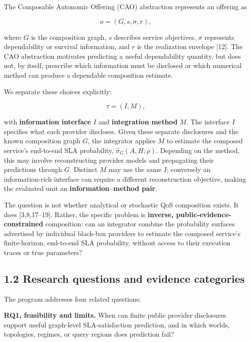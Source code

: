 \documentclass[10pt,a4paper]{article}
\begin{document}
The Composable Autonomic Offering (CAO) abstraction represents an offering as

\begin{equation*}
o=(G,s,\sigma,r), \tag{1}
\end{equation*}

where $G$ is the composition graph, $s$ describes service objectives, $\sigma$ represents dependability or survival information, and $r$ is the realization envelope [12]. The CAO abstraction motivates predicting a useful dependability quantity, but does not, by itself, prescribe which information must be disclosed or which numerical method can produce a dependable composition estimate.

We separate these choices explicitly:

\begin{equation*}
\tau=(I,M), \tag{2}
\end{equation*}

with \textbf{information interface} $I$ and \textbf{integration method} $M$. The interface $I$ specifies what each provider discloses. Given these separate disclosures and the known composition graph $G$, the integrator applies $M$ to estimate the composed service's end-to-end SLA probability, $\widehat\sigma_G(A,H;\rho)$. Depending on the method, this may involve reconstructing provider models and propagating their predictions through $G$. Distinct $M$ may use the same $I$; conversely an information-rich interface can require a different reconstruction objective, making the evaluated unit an \textbf{information–method pair}.

The question is not whether analytical or stochastic QoS composition exists. It does [3,8,17–19]. Rather, the specific problem is \textbf{inverse, public-evidence-constrained} composition: can an integrator combine the probability surfaces advertised by individual black-box providers to estimate the composed service's finite-horizon, end-to-end SLA probability, without access to their execution traces or true parameters?

\subsection*{1.2 Research questions and evidence categories}

The program addresses four related questions:

\textbf{RQ1, feasibility and limits.} When can finite public provider disclosures support useful graph-level SLA-satisfaction prediction, and in which worlds, topologies, regimes, or query regions does prediction fail?
\end{document}
